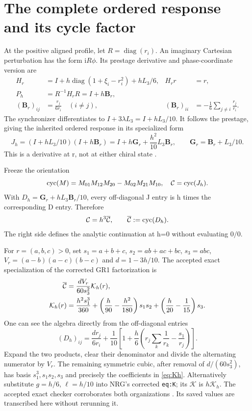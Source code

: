 \documentclass[11pt,a4paper]{article}
\numberwithin{equation}{section}
\theoremstyle{remark}\newtheorem{remark}[theorem]{Remark}
\newcommand{\iu}{\mathrm i}\newcommand{\Id}{I}\newcommand{\Argz}{\operatorname{Arg}_0}
\newcommand{\cyc}{\operatorname{cyc}}\newcommand{\diag}{\operatorname{diag}}
\newcommand{\Br}{\mathbf B_r}\newcommand{\Gr}{\mathbf G_r}\newcommand{\mathscr}{\mathcal}
\begin{document}
\clearpage
\section{The complete ordered response and its cycle factor}\label{sec:response}
At the positive aligned profile, let $R=\diag(r_i)$. An imaginary Cartesian perturbation has the form $\iu R\phi$. Its prestage derivative and phase-coordinate version are
\begin{align}
H_r&=I+h\diag(1+\xi_i-r_i^2)+hL_3/6,
&H_rr&=r,\label{eq:cartesian}\\
P_h&=R^{-1}H_rR=I+h\Br,\label{eq:pre-response}\\
(\Br)_{ij}&=\frac{r_j}{6r_i}\quad(i\ne j),
&(\Br)_{ii}&=-\frac16\sum_{j\ne i}\frac{r_j}{r_i}.\label{eq:B}
\end{align}
The synchronizer differentiates to $I+3\lambda L_3=I+hL_3/10$. It follows the prestage, giving the inherited ordered response in its specialized form
\begin{equation}
\boxed{J_h=(I+hL_3/10)(I+h\Br)
=I+h\Gr+\frac{h^2}{10}L_3\Br},\qquad \Gr=\Br+L_3/10.
\label{eq:J}
\end{equation}
This is a derivative at r, not at either chiral state \cite[\texttt{eq:P}, \texttt{eq:SP}]{nrg}.

Freeze the orientation
\begin{equation}
\cyc(M)=M_{01}M_{12}M_{20}-M_{02}M_{21}M_{10},
\quad \calC=\cyc(J_h).
\label{eq:orientation}
\end{equation}
With $D_h=\Gr+hL_3\Br/10$, every off-diagonal J entry is h times the corresponding D entry. Therefore
\begin{equation}
\calC=h^3\Cbar,\qquad \Cbar:=\cyc(D_h).
\label{eq:normalization}
\end{equation}
The right side defines the analytic continuation at h=0 without evaluating $0/0$.

For $r=(a,b,c)>0$, set $s_1=a+b+c$, $s_2=ab+ac+bc$, $s_3=abc$, $V_r=(a-b)(a-c)(b-c)$ and $d=1-3h/10$. The accepted exact specialization of the corrected GR1 factorization is
\begin{align}
\overline{\mathcal C}&=\frac{dV_r}{60s_3^2}\mathcal K_h(r),\label{eq:cycle-factor}\\
\mathcal K_h(r)&=\frac{h^2s_1^3}{360}
+\left(\frac h{90}-\frac{h^2}{180}\right)s_1s_2
+\left(\frac h{20}-\frac1{15}\right)s_3.\label{eq:Kh}
\end{align}
One can see the algebra directly from the off-diagonal entries
\begin{equation}
(D_h)_{ij}=\frac{d r_j}{6r_i}
+\frac1{10}\left[1+\frac h6\left(r_j\sum_k\frac1{r_k}-\frac{s_1}{r_j}\right)\right].
\label{eq:Dentries}
\end{equation}
Expand the two products, clear their denominator and divide the alternating numerator by $V_r$. The remaining symmetric cubic, after removal of $d/(60s_3^2)$, has basis $s_1^3,s_1s_2,s_3$ and precisely the coefficients in \eqref{eq:Kh}. Alternatively substitute $g=h/6$, $\ell=h/10$ into NRG's corrected \texttt{eq:K}; its $\mathcal K$ is $h\mathcal K_h$. The accepted exact checker corroborates both organizations \cite[\S3]{rd}. Its saved values are transcribed here without rerunning it.
\end{document}

